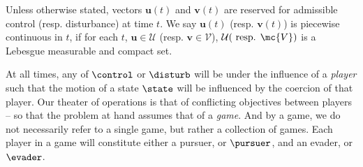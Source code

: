 Unless otherwise stated, vectors $\bm{u}(t)$ and $\bm{v}(t)$ are reserved for admissible control (resp. disturbance) at time $t$. We say $\bm{u}(t)$ (resp. $\bm{v}(t)$) is piecewise continuous in $t$, if for each $t$, $\bm{u} \in \mathcal{U}$ (resp. $\bm{v} \in \mathcal{V}$), $\mathcal{U}(\text{ resp. } \mc{V})$ is a Lebesgue measurable and compact set. 

At all times, any of $\control$ or $\disturb$ will be under the influence of a \textit{player} such that the motion of a state $\state$ will be influenced by the coercion of that player. Our theater of operations is that of conflicting objectives between players -- so that the problem at hand assumes that of a \textit{game}. And by a game, we do not necessarily refer to a single game, but rather a collection of games.  Each player in a game will constitute either a pursuer, or $\pursuer$, and an evader, or $\evader$.  %
%

